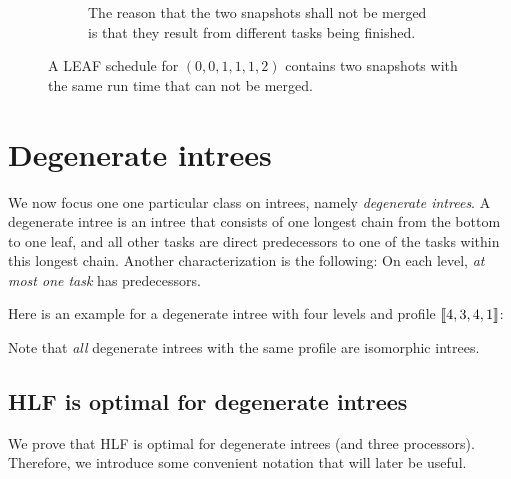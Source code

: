 \begin{figure}[th]
\begin{subfigure}{.45\textwidth}
    \caption{The reason that the two snapshots shall not be merged is that they result from different tasks being finished.}
  \label{fig:p3-001112-two-snaps-same-run-time-not-mergeable-optimal}
  \end{subfigure}
  \caption{A LEAF schedule for $(0,0,1,1,1,2)$ contains two snapshots with the same run time that can not be merged.}
  \label{fig:p3-001112-two-snaps-same-run-time-not-mergeable}
\end{figure}

\section{Degenerate intrees}
\label{sec:p3-degenerate-intrees}

We now focus one one particular class on intrees, namely \emph{degenerate intrees}. A degenerate intree is an intree that consists of one longest chain from the bottom to one leaf, and all other tasks are direct predecessors to one of the tasks within this longest chain. Another characterization is the following: On each level, \emph{at most one task} has predecessors. 

Here is an example for a degenerate intree with four levels and profile $\left\llbracket 4,3,4,1 \right\rrbracket$:

\begin{center}  
\end{center}

Note that \emph{all} degenerate intrees with the same profile are isomorphic intrees.

\subsection{HLF is optimal for degenerate intrees}
\label{sec:p3-degenerate-intrees-hlf-optimal}

We prove that HLF is optimal for degenerate intrees (and three processors). Therefore, we introduce some convenient notation that will later be useful.

